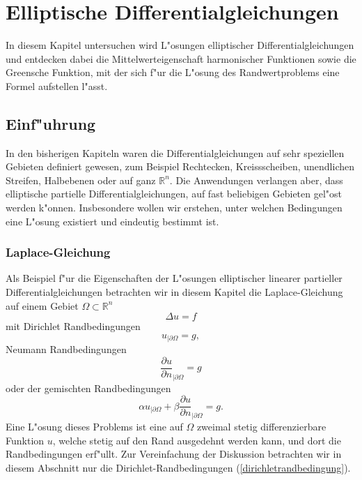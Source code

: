 %
%
%
\chapter{Elliptische Differentialgleichungen\label{chapter-elliptisch}}
In diesem Kapitel untersuchen wird L"osungen elliptischer Differentialgleichungen
und entdecken dabei die Mittelwerteigenschaft
harmonischer Funktionen sowie die Greensche Funktion, mit der sich f"ur
die L"osung des Randwertproblems eine Formel aufstellen l"asst.

\section{Einf"uhrung}
In den bisherigen Kapiteln waren die Differentialgleichungen auf sehr
speziellen Gebieten definiert gewesen, zum Beispiel Rechtecken, Kreissscheiben,
unendlichen Streifen, Halbebenen oder auf ganz $\mathbb R^n$. 
Die Anwendungen verlangen aber, dass elliptische partielle
Differentialgleichungen, auf fast beliebigen Gebieten gel"ost werden k"onnen.
Insbesondere wollen wir erstehen, unter welchen Bedingungen eine
L"osung existiert und eindeutig bestimmt ist.

\subsection{Laplace-Gleichung}
Als Beispiel f"ur die Eigenschaften der L"osungen
elliptischer linearer partieller Differentialgleichungen
betrachten wir in diesem Kapitel die Laplace-Gleichung
auf einem Gebiet $\Omega\subset\mathbb R^n$
\begin{equation}
\Delta u=f
\label{laplaceequation}
\end{equation}
mit
Dirichlet Randbedingungen
\begin{equation}
u_{|\partial \Omega}=g,
\label{dirichletrandbedingung}
\end{equation}
Neumann Randbedingungen
\[
\frac{\partial u}{\partial n}_{|\partial \Omega}=g
\]
oder der gemischten Randbedingungen
\[
\alpha u_{|\partial \Omega}+
\beta\frac{\partial u}{\partial n}_{|\partial \Omega}=g.
\]
Eine L"osung dieses Problems ist eine auf $\Omega$
zweimal stetig differenzierbare
Funktion $u$, welche stetig auf den Rand ausgedehnt werden kann,
und dort die Randbedingungen erf"ullt. Zur Vereinfachung der
Diskussion betrachten wir in diesem Abschnitt nur die
Dirichlet-Randbedingungen (\ref{dirichletrandbedingung}).

